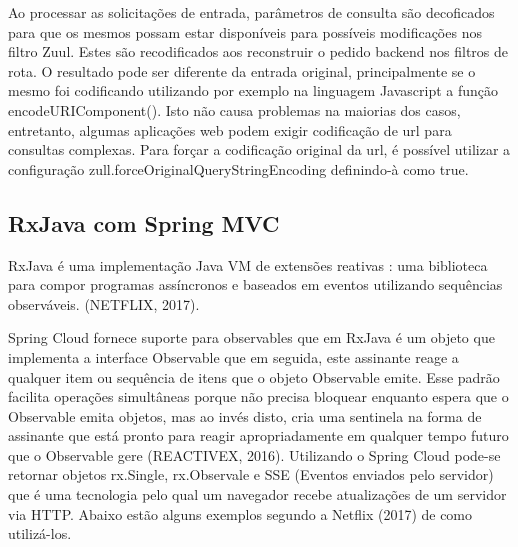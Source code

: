 Ao processar as solicitações de entrada, parâmetros de consulta são  decoficados para que os mesmos possam estar disponíveis para possíveis modificações nos filtro Zuul. Estes são recodificados aos reconstruir o pedido backend nos filtros de rota. O resultado pode ser diferente da entrada original, principalmente se o mesmo foi codificando utilizando por exemplo na linguagem Javascript a função encodeURIComponent(). Isto não causa problemas na maiorias dos casos, entretanto, algumas aplicações web podem exigir codificação de url para consultas complexas. Para forçar a codificação original da url, é possível utilizar a configuração zull.forceOriginalQueryStringEncoding definindo-à como true.


\subsection{RxJava com Spring MVC}

RxJava é uma implementação Java VM de extensões reativas : uma biblioteca para compor programas assíncronos e baseados em eventos utilizando sequências observáveis. (NETFLIX, 2017).

Spring Cloud fornece suporte para observables que em RxJava é um objeto que implementa a interface Observable que em seguida, este assinante reage a qualquer item ou sequência de itens que o objeto Observable emite. Esse padrão facilita operações simultâneas porque não precisa bloquear enquanto espera que o Observable emita objetos, mas ao invés disto, cria uma sentinela na forma de assinante que está pronto para reagir apropriadamente em qualquer tempo futuro que o Observable gere (REACTIVEX, 2016). Utilizando o Spring Cloud pode-se retornar objetos rx.Single, rx.Observale e SSE (Eventos enviados pelo servidor) que é uma tecnologia pelo qual um navegador recebe atualizações de um servidor via HTTP. Abaixo estão alguns exemplos segundo a Netflix (2017) de como utilizá-los.

